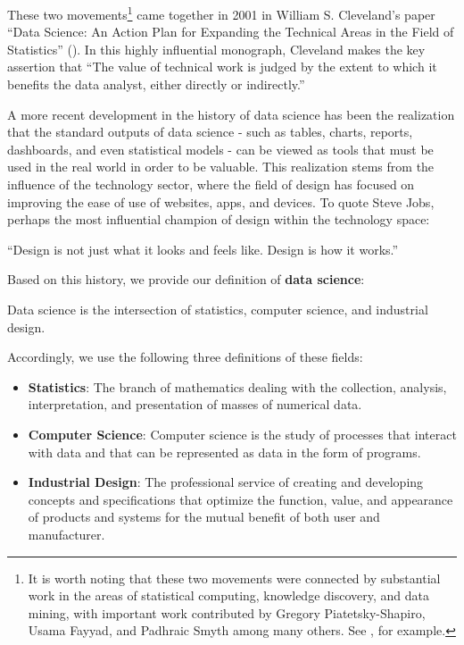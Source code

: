 \documentclass[
]{krantz}
\providecommand{\tightlist}{%
  \setlength{\itemsep}{0pt}\setlength{\parskip}{0pt}}
\renewenvironment{quote}{\begin{VF}}{\end{VF}}
\begin{document}
These two movements\footnote{It is worth noting that these two movements were connected by substantial work in the areas of statistical computing, knowledge discovery, and data mining, with important work contributed by Gregory Piatetsky-Shapiro, Usama Fayyad, and Padhraic Smyth among many others. See \citet{Fayyad1996}, for example.} came together in 2001 in William S. Cleveland's paper ``Data Science: An Action Plan for Expanding the Technical Areas in the Field of Statistics'' (\citet{Cleveland2001}). In this highly influential monograph, Cleveland makes the key assertion that ``The value of technical work is judged by the extent to which it benefits the data analyst, either directly or indirectly.''

A more recent development in the history of data science has been the realization that the standard outputs of data science - such as tables, charts, reports, dashboards, and even statistical models - can be viewed as tools that must be used in the real world in order to be valuable. This realization stems from the influence of the technology sector, where the field of design has focused on improving the ease of use of websites, apps, and devices. To quote Steve Jobs, perhaps the most influential champion of design within the technology space:

\begin{quote}
``Design is not just what it looks and feels like. Design is how it works.''
\end{quote}

Based on this history, we provide our definition of \textbf{data science}:

\begin{quote}
Data science is the intersection of statistics, computer science, and industrial design.
\end{quote}

Accordingly, we use the following three definitions of these fields:

\begin{itemize}
\tightlist
\item
  \textbf{Statistics}: The branch of mathematics dealing with the collection, analysis, interpretation, and presentation of masses of numerical data.
\item
  \textbf{Computer Science}: Computer science is the study of processes that interact with data and that can be represented as data in the form of programs.
\item
  \textbf{Industrial Design}: The professional service of creating and developing concepts and specifications that optimize the function, value, and appearance of products and systems for the mutual benefit of both user and manufacturer.
\end{itemize}
\end{document}
